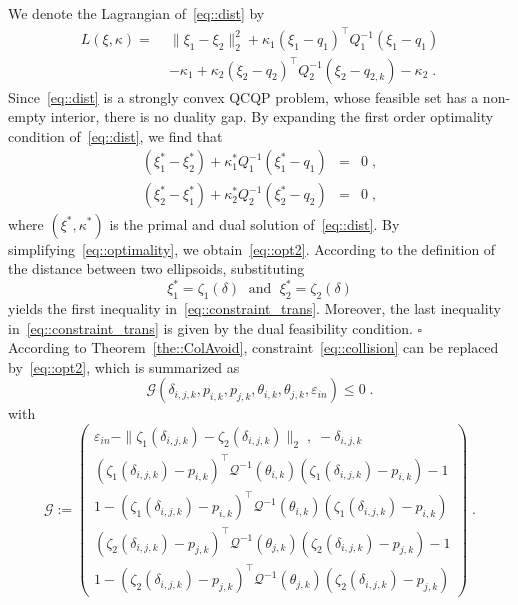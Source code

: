 \documentclass[letterpaper, 10 pt, conference]{ieeeconf}
\begin{document}
We denote the Lagrangian of~\eqref{eq::dist} by
\[
\begin{split}
L(\xi,\kappa) =\;&\|\xi_1-\xi_2\|_2^2 +\kappa_1(\xi_1-q_{1})^\top Q_1^{-1} (\xi_1-q_{1}) \\[0.1cm]
& -\kappa_1+ \kappa_2(\xi_2-q_{2})^\top Q_2^{-1} (\xi_2-q_{2,k})-\kappa_2\;.
\end{split}
\]
Since~\eqref{eq::dist} is a strongly convex QCQP problem, whose feasible set has a non-empty interior, there is no duality gap. By expanding the first order optimality condition of~\eqref{eq::dist}, we find that
\begin{equation}
\label{eq::optimality}
\begin{array}{ccl}
(\xi_1^*-\xi_2^*) + \kappa_1^* Q_1^{-1}(\xi_1^*-q_{1})&=&0\;,\\[0.16cm]
(\xi_2^*-\xi_1^*) + \kappa_2^* Q_2^{-1}(\xi_2^*-q_{2})&=&0\;,
\end{array}
\end{equation}
where $(\xi^*,\kappa^*)$ is the primal and dual solution of~\eqref{eq::dist}. By simplifying~\eqref{eq::optimality}, we obtain~\eqref{eq::opt2}. According to the definition of the distance between two ellipsoids, substituting
\[
\xi_1^* = \zeta_1(\delta)\;\text{ and }\;\xi_2^* = \zeta_2(\delta)
\]
yields the first inequality in~\eqref{eq::constraint_trans}. Moreover, the last inequality in~\eqref{eq::constraint_trans} is given by the dual feasibility condition. \hfill$\square$\\[0.4cm]
\noindent
According to Theorem~\ref{the::ColAvoid}, constraint~\eqref{eq::collision} can be replaced by~\eqref{eq::opt2}, which is summarized as
\begin{equation}
\label{eq::ellipdistcons}
\mathcal{G}(\delta_{i,j,k},p_{i,k},p_{j,k},\theta_{i,k},\theta_{j,k},\varepsilon_{in})\leq 0\;.
\end{equation}
with
\[
\mathcal{G} \!:=\!\left(
\begin{array}{c}\!
\varepsilon_{in} - \|\zeta_1(\delta_{i,j,k}) - \zeta_2(\delta_{i,j,k})\|_2\;,\;-\delta_{i,j,k}\\[0.16cm]
(\zeta_1(\delta_{i,j,k})-p_{i,k})^\top \mathcal{Q}^{-1}(\theta_{i,k}) (\zeta_1(\delta_{i,j,k})-p_{i,k})-1\\[0.16cm]
1-(\zeta_1(\delta_{i,j,k})-p_{i,k})^\top \mathcal{Q}^{-1}(\theta_{i,k}) (\zeta_1(\delta_{i,j,k})-p_{i,k})\\[0.16cm]
(\zeta_2(\delta_{i,j,k})-p_{j,k})^\top \mathcal{Q}^{-1}(\theta_{j,k}) (\zeta_2(\delta_{i,j,k})-p_{j,k})-1\\[0.16cm]
1-(\zeta_2(\delta_{i,j,k})-p_{j,k})^\top \mathcal{Q}^{-1}(\theta_{j,k}) (\zeta_2(\delta_{i,j,k})-p_{j,k})
\end{array}
\!\right) \;.
\]
\end{document}
